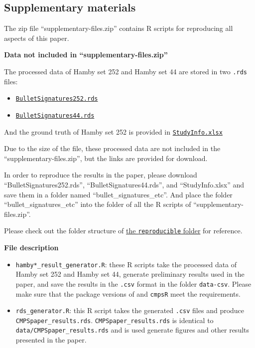 \hypertarget{supplementary-materials}{%
\subsection{Supplementary materials}\label{supplementary-materials}}

The zip file ``supplementary-files.zip'' contains R scripts for
reproducing all aspects of this paper.

\textbf{Data not included in ``supplementary-files.zip''}

The processed data of Hamby set 252 and Hamby set 44 are stored in two
\texttt{.rds} files:

\begin{itemize}
\tightlist
\item
  \href{https://github.com/willju-wangqian/CMPSpaper/blob/main/reproducible/bullet_signatures_etc/BulletSignatures252.rds}{\texttt{BulletSignatures252.rds}}
\item
  \href{https://github.com/willju-wangqian/CMPSpaper/blob/main/reproducible/bullet_signatures_etc/BulletSignatures44.rds}{\texttt{BulletSignatures44.rds}}
\end{itemize}

And the ground truth of Hamby set 252 is provided in
\href{https://github.com/willju-wangqian/CMPSpaper/blob/main/reproducible/bullet_signatures_etc/StudyInfo.xlsx}{\texttt{StudyInfo.xlsx}}

Due to the size of the file, these processed data are not included in
the ``supplementary-files.zip'', but the links are provided for
download.

In order to reproduce the results in the paper, please download
``BulletSignatures252.rds'', ``BulletSignatures44.rds'', and
``StudyInfo.xlsx'' and save them in a folder named
``bullet\_signatures\_etc''. And place the folder
``bullet\_signatures\_etc'' into the folder of all the R scripts of
``supplementary-files.zip''.

Please check out the folder structure of
\href{https://github.com/willju-wangqian/CMPSpaper/tree/main/reproducible}{the
\texttt{reproducible} folder} for reference.

\textbf{File description}

\begin{itemize}
\tightlist
\item
  \texttt{hamby*\_result\_generator.R}: these R scripts take the
  processed data of Hamby set 252 and Hamby set 44, generate preliminary
  results used in the paper, and save the results in the \texttt{.csv}
  format in the folder \texttt{data-csv}. Please make sure that the
  package versions of  and \texttt{cmpsR} meet the
  requirements.
\item
  \texttt{rds\_generator.R}: this R script takes the generated
  \texttt{.csv} files and produce \texttt{CMPSpaper\_results.rds}.
  \texttt{CMPSpaper\_results.rds} is identical to
  \texttt{data/CMPSpaper\_results.rds} and is used generate figures and
  other results presented in the paper.
\end{itemize}

